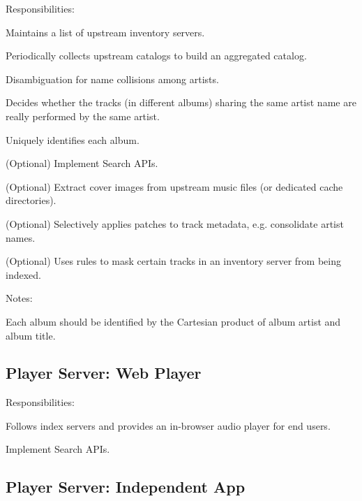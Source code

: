 \documentclass[a4paper,11pt]{article}
\begin{document}
Responsibilities:

\begin{compactitem}
	\item Maintains a list of upstream inventory servers.
	\item Periodically collects upstream catalogs to build an aggregated catalog.
	\item Disambiguation for name collisions among artists.
	\item Decides whether the tracks (in different albums) sharing the same artist name are really performed by the same artist.
	\item Uniquely identifies each album.
	\item (Optional) Implement Search APIs.
	\item (Optional) Extract cover images from upstream music files (or dedicated cache directories).
	\item (Optional) Selectively applies patches to track metadata, e.g. consolidate artist names.
	\item (Optional) Uses rules to mask certain tracks in an inventory server from being indexed.
\end{compactitem}

Notes:

\begin{compactitem}
	\item Each album should be identified by the Cartesian product of album artist and album title.
\end{compactitem}














\subsection{Player Server: Web Player}

Responsibilities:

\begin{compactitem}
	\item Follows index servers and provides an in-browser audio player for end users.
	\item Implement Search APIs.
\end{compactitem}

\subsection{Player Server: Independent App}
\end{document}
